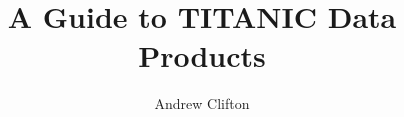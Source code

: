 \documentclass[]{refrep}
\title{A Guide to TITANIC Data Products}
\author{Andrew Clifton}
\begin{document}

\maketitle
\tableofcontents
\clearpage
\listoftables

\clearpage




%
%


\cleardoublepage
\label{sec:Bib}



\clearpage
\printindex
\end{document}

